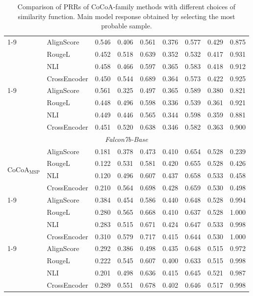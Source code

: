 \documentclass[11pt]{article}
\begin{document}
\begin{table}[htbp]
{\begin{tabular}{ll ccccccc}
\cmidrule(lr){1-9}
\multirow{4}{*}{CoCoA$_{\mathrm{PPL}}$}
 & AlignScore & 0.546 & 0.406 & 0.561 & 0.376 & 0.577 & 0.429 & 0.875 \\
 & RougeL & 0.452 & 0.518 & 0.639 & 0.352 & 0.532 & 0.417 & 0.931 \\
 & NLI & 0.458 & 0.466 & 0.597 & 0.365 & 0.583 & 0.418 & 0.912 \\
 & CrossEncoder & 0.450 & 0.544 & 0.689 & 0.364 & 0.573 & 0.422 & 0.925 \\
\cmidrule(lr){1-9}
\multirow{4}{*}{CoCoA$_{\mathrm{MTE}}$}
 & AlignScore & 0.561 & 0.325 & 0.497 & 0.365 & 0.589 & 0.380 & 0.821 \\
 & RougeL & 0.448 & 0.496 & 0.598 & 0.336 & 0.539 & 0.361 & 0.921 \\
 & NLI & 0.449 & 0.446 & 0.565 & 0.344 & 0.598 & 0.359 & 0.881 \\
 & CrossEncoder & 0.451 & 0.520 & 0.638 & 0.346 & 0.582 & 0.363 & 0.900 \\
\midrule
\multicolumn{9}{c}{\textit{Falcon7b-Base}} \\
\midrule
\multirow{4}{*}{CoCoA$_{\mathrm{MSP}}$}
 & AlignScore & 0.181 & 0.378 & 0.473 & 0.410 & 0.654 & 0.528 & 0.239 \\
 & RougeL & 0.122 & 0.531 & 0.581 & 0.420 & 0.655 & 0.528 & 0.426 \\
 & NLI & 0.120 & 0.496 & 0.607 & 0.437 & 0.658 & 0.533 & 0.458 \\
 & CrossEncoder & 0.210 & 0.564 & 0.698 & 0.428 & 0.659 & 0.530 & 0.498 \\
\cmidrule(lr){1-9}
\multirow{4}{*}{CoCoA$_{\mathrm{PPL}}$}
 & AlignScore & 0.384 & 0.454 & 0.586 & 0.440 & 0.648 & 0.528 & 0.994 \\
 & RougeL & 0.280 & 0.565 & 0.668 & 0.410 & 0.637 & 0.528 & 1.000 \\
 & NLI & 0.283 & 0.515 & 0.671 & 0.424 & 0.647 & 0.533 & 0.998 \\
 & CrossEncoder & 0.310 & 0.579 & 0.717 & 0.415 & 0.644 & 0.530 & 1.000 \\
\cmidrule(lr){1-9}
\multirow{4}{*}{CoCoA$_{\mathrm{MTE}}$}
 & AlignScore & 0.292 & 0.386 & 0.498 & 0.435 & 0.648 & 0.515 & 0.972 \\
 & RougeL & 0.222 & 0.545 & 0.607 & 0.400 & 0.633 & 0.515 & 0.998 \\
 & NLI & 0.201 & 0.498 & 0.636 & 0.415 & 0.645 & 0.521 & 0.987 \\
 & CrossEncoder & 0.289 & 0.551 & 0.678 & 0.402 & 0.646 & 0.517 & 0.998 \\
\bottomrule
\end{tabular}%
}
\caption{Comparison of PRRs of CoCoA-family methods with different choices of similarity function. Main model response obtained by selecting the most probable sample.}
\label{tab:cocoa_table6}
\end{table}
\end{document}
